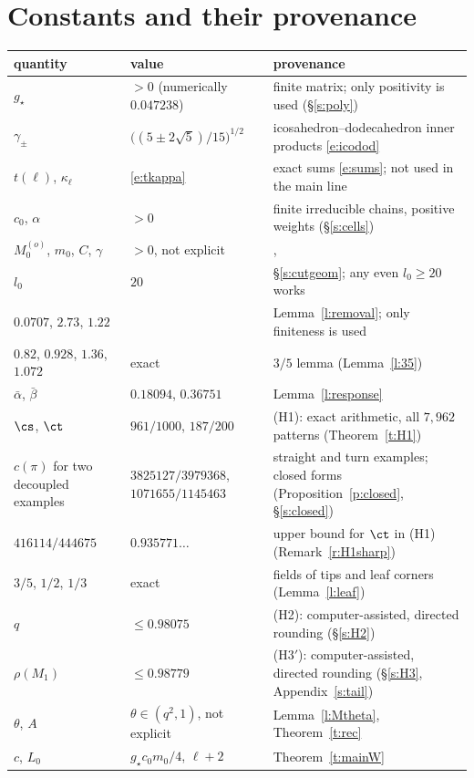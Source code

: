 \section{Constants and their provenance}\label{s:constants}

\begin{center}
\begin{tabular}{>{\raggedright\arraybackslash}p{}>{\raggedright\arraybackslash}p{}>{\raggedright\arraybackslash}p{}}
quantity & value & provenance \\
\hline
$g_\star$ & $> 0$ (numerically $0.047238$) & finite matrix; only positivity is used (\S\ref{s:poly}) \\
$\gamma_\pm$ & $\bigl((5 \pm 2\sqrt5)/15\bigr)^{1/2}$ & icosahedron--dodecahedron inner products \eqref{e:icodod} \\
$t(\ell)$, $\kappa_\ell$ & \eqref{e:tkappa} & exact sums \eqref{e:sums}; not used in the main line \\
$c_0$, $\alpha$ & $> 0$ & finite irreducible chains, positive weights (\S\ref{s:cells}) \\
$M_0^{(o)}$, $m_0$, $C$, $\gamma$ & $> 0$, not explicit & \cite[Theorem~2.1]{MOS94}, \cite[Theorem~4.1]{MO94} \\
$l_0$ & $20$ & \S\ref{s:cutgeom}; any even $l_0 \ge 20$ works \\
$0.0707$, $2.73$, $1.22$ & & Lemma~\ref{l:removal}; only finiteness is used \\
$0.82$, $0.928$, $1.36$, $1.072$ & exact & $3/5$ lemma (Lemma~\ref{l:35}) \\
$\bar\alpha$, $\bar\beta$ & $0.18094$, $0.36751$ & Lemma~\ref{l:response} \\
$\cs$, $\ct$ & $961/1000$, $187/200$ & (H1): exact arithmetic, all $7{,}962$ patterns (Theorem~\ref{t:H1}) \\
$c(\pi)$ for two decoupled examples & $3825127/3979368$, $1071655/1145463$ & straight and turn examples; closed forms (Proposition~\ref{p:closed}, \S\ref{s:closed}) \\
$416114/444675$ & $0.935771\ldots$ & upper bound for $\ct$ in (H1) (Remark~\ref{r:H1sharp}) \\
$3/5$, $1/2$, $1/3$ & exact & fields of tips and leaf corners (Lemma~\ref{l:leaf}) \\
$q$ & $\le 0.98075$ & (H2): computer-assisted, directed rounding (\S\ref{s:H2}) \\
$\rho(M_1)$ & $\le 0.98779$ & (H3$'$): computer-assisted, directed rounding (\S\ref{s:H3}, Appendix~\ref{s:tail}) \\
$\theta$, $A$ & $\theta \in (q^2, 1)$, not explicit & Lemma~\ref{l:Mtheta}, Theorem~\ref{t:rec} \\
$c$, $L_0$ & $g_\star c_0 m_0 / 4$, $\ell + 2$ & Theorem~\ref{t:mainW}
\end{tabular}
\end{center}
